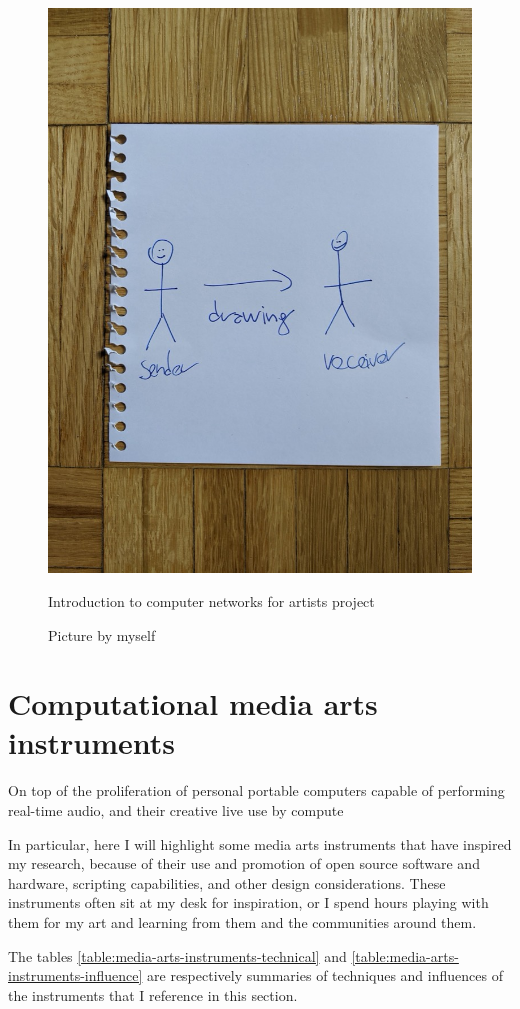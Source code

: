 \begin{figure}[ht]
  \centering
  \includegraphics[width=0.75\linewidth,height=0.25\textheight,keepaspectratio]{images/intro-to-computer-networks-for-artists.jpg}
  \caption{Introduction to computer networks for artists project}
  \caption*{Picture by myself}
  \label{fig:intro-to-computer-networks-for-artists}
\end{figure}

\section{Computational media arts instruments}

On top of the proliferation of personal portable computers capable of performing real-time audio, and their creative live use by compute

In particular, here I will highlight some media arts instruments that have inspired my research, because of their use and promotion of open source software and hardware, scripting capabilities, and other design considerations. These instruments often sit at my desk for inspiration, or I spend hours playing with them for my art and learning from them and the communities around them.

The tables \ref{table:media-arts-instruments-technical} and \ref{table:media-arts-instruments-influence} are respectively summaries of techniques and influences of the instruments that I reference in this section.

